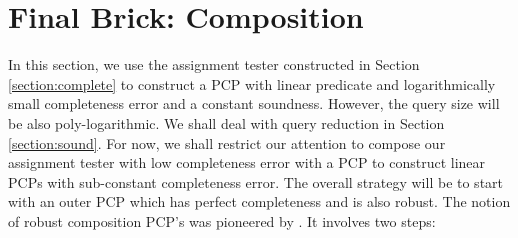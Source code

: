 
\chapter{Final Brick: Composition}\label{section:composition}
In this section, we use the assignment tester constructed in Section \ref{section:complete}
to construct a PCP with linear predicate and logarithmically small completeness error and a constant
soundness. However, the query size will be also poly-logarithmic. We shall deal with query reduction
in Section \ref{section:sound}. For now, we shall restrict our attention to compose our assignment
tester with low completeness error with a PCP to construct linear PCPs with sub-constant
completeness error. The overall strategy will be to start with an outer PCP which has
perfect completeness and is also robust. The notion of robust
composition PCP's was pioneered by \cite{BGHSV,DR}. It involves
two steps:


